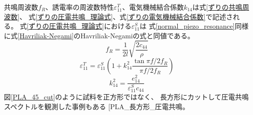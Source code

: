 \documentclass[dvipdfmx,12pt,a4paper]{jreport}
\makeatletter
\DeclareRobustCommand\cite{\unskip
    	\@ifnextchar[{\@tempswatrue\@citex}{\@tempswafalse\@citex[]}}
\makeatother
\begin{document}
			共鳴周波数$f_R$、誘電率の周波数特性$\varepsilon_{11}^T$、電気機械結合係数$k_{14}$は式\eqref{ずりの共鳴周波数}、
			式\eqref{ずりの圧電共鳴_理論式}、式\eqref{ずりの電気機械結合係数}で記述される。
			式\eqref{ずりの圧電共鳴_理論式}における$\varepsilon_{11}^S$は
			式\eqref{normal_piezo_resonance}同様に式\eqref{Havriliak-Negami}のHavriliak-Negamiの式と同値である。
			\begin{equation}
				f_R = \frac{1}{2l}\sqrt{\frac{2c_{44}}{\rho}}
				\label{ずりの共鳴周波数}
			\end{equation}
			\begin{equation}
				\varepsilon_{11}^T=\varepsilon_{11}^S\left(1+k_{14}^2\frac{\tan{\pi f/2f_R}}{\pi f/2f_R}\right)
				\label{ずりの圧電共鳴_理論式}
			\end{equation}
			\begin{equation}
				k_{14}^2=\frac{e_{14}^2}{\varepsilon_{11}^Sc_{44}}
				\label{ずりの電気機械結合係数}
			\end{equation}
			図\ref{PLA_45_cut}のように試料を正方形ではなく、
			長方形にカットして圧電共鳴スペクトルを観測した事例もある
			\cite{PLA_長方形_圧電共鳴}。
\end{document}
